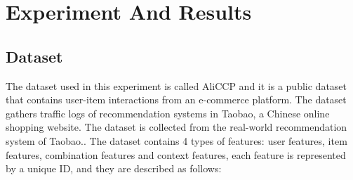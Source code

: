 \chapter{Experiment And Results}
\minitoc

\section{Dataset}

The dataset used in this experiment is called AliCCP and it is a public dataset that contains user-item interactions from an e-commerce platform. The dataset gathers traffic logs of recommendation systems in Taobao, a Chinese online shopping website. The dataset is collected from the real-world recommendation system of Taobao.\cite{AliCPP}. The dataset contains 4 types of features: user features, item features, combination features and context features, each feature is represented by a unique ID, and they are described as follows:

